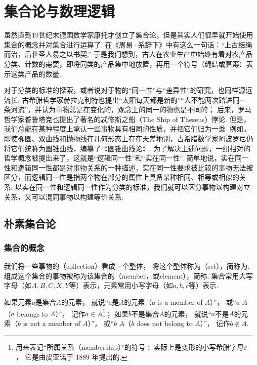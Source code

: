 \chapter{集合论与数理逻辑}
虽然直到19世纪末德国数学家康托才创立了集合论，但是其实人们很早就开始使用集合的概念并对集合进行运算了.
在《周易·系辞下》中有这么一句话：“上古结绳而治，后世圣人易之以书契.”
于是我们想到，古人在农业生产中始终有着对农产品分类、计数的需要，即将同类的产品集中地放置，再用一个符号（绳结或算筹）表示这类产品的数量.

对于分类的标准的探索，或者说对于物的“同一性”与“差异性”的研究，也同样源远流长.
古希腊哲学家赫拉克利特也提出“太阳每天都是新的”“人不能两次踏进同一条河流”，并认为事物总是在变化的，观念上的同一的物也是不同的；
后来，罗马哲学家普鲁塔克也提出了著名的忒修斯之船（The Ship of Theseus）悖论.
但是，我们总能在某种程度上承认一些事物具有相同的性质，并把它们归为一类.
例如，即使椭圆、双曲线和抛物线在几何形态上存在天差地别，古希腊数学家阿波罗尼仍将它们统称为圆锥曲线，编纂了《圆锥曲线论》.
为了解决上述问题，一组相对的哲学概念被提出来了，这就是“逻辑同一性”和“实在同一性”.
简单地说，实在同一性和逻辑同一性都是对事物关系的一种描述，实在同一性要求被比较的事物无法被区分，而逻辑同一性是指两个物在部分的属性上具备某种相同、相等或相似的关系.
以实在同一性和逻辑同一性作为分类的标准，我们就可以区分事物以构建对立关系，又可以混同事物以构建等价关系.

\section{朴素集合论}
\subsection{集合的概念}
\begin{definition}
我们将一些事物的（collection）看成一个整体，%
将这个整体称为（set），简称为.
组成这个集合的事物被称为该集合的（member，或element），简称.
集合常用大写字母（如\(A,B,C,X,Y\)等）表示，元素常用小写字母（如\(a,b,c\)等）表示.

如果元素\(a\)是集合\(A\)的元素，%
就说“\(a\)是\(A\)的元素（\(a\) is a member of \(A\)）”，%
或“\(a\) \(A\)（\(a\) belongs to \(A\)）”，%
记作\(a \in A\)\footnote{%
用来表记“所属关系（membership）”的符号\(\in\)实际上是变形的小写希腊字母\(\varepsilon\)，%
它是由皮亚诺于 1889 年提出的.}；
如果\(b\)不是集合\(A\)的元素，%
就说“\(a\)不是\(A\)的元素（\(b\) is not a member of \(A\)）”，%
或“\(b\) \(A\)（\(b\) does not belong to \(A\)）”，%
记作\(b \notin A\).
\end{definition}

